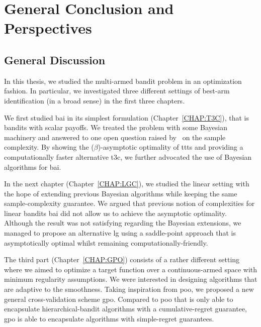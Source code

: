 \chapter{General Conclusion and Perspectives}\label{CHAP:CONCLUSION}
	\minitoc
	\newpage


\section{General Discussion} 

In this thesis, we studied the multi-armed bandit problem in an optimization fashion. In particular, we investigated three different settings of best-arm identification (in a broad sense) in the first three chapters. 

We first studied \gls{bai} in its simplest formulation (Chapter~\ref{CHAP:T3C}), that is bandits with scalar payoffs. We treated the problem with some Bayesian machinery and answered to one open question raised by~\cite{russo2016ttts} on the sample complexity. By showing the ($\beta$)-asymptotic optimality of \gls{ttts} and providing a computationally faster alternative \gls{t3c}, we further advocated the use of Bayesian algorithms for \gls{bai}.

In the next chapter (Chapter~\ref{CHAP:LGC}), we studied the linear setting with the hope of extending previous Bayesian algorithms while keeping the same sample-complexity guarantee. We argued that previous notion of complexities for linear bandits \gls{bai} did not allow us to achieve the asymptotic optimality. Although the result was not satisfying regarding the Bayesian extensions, we managed to propose an alternative \gls{lg} using a saddle-point approach that is asymptotically optimal whilst remaining computationally-friendly.

The third part (Chapter~\ref{CHAP:GPO}) consists of a rather different setting where we aimed to optimize a target function over a continuous-armed space with minimum regularity assumptions. We were interested in designing algorithms that are adaptive to the smoothness. Taking inspiration from \gls{poo}, we proposed a new general cross-validation scheme \gls{gpo}. Compared to \gls{poo} that is only able to encapsulate hierarchical-bandit algorithms with a cumulative-regret guarantee, \gls{gpo} is able to encapsulate algorithms with simple-regret guarantees.

